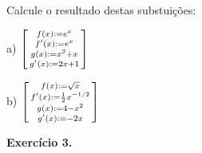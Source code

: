 \documentclass[oneside,12pt]{article}
\begin{document}
\msk

Calcule o resultado destas substuições:

\msk

a) $\ga{Rc} \bsm{
     f (x) := e^x \\
     f'(x) := e^x \\
     g (x) := x^2 + x \\
     g'(x) := 2x + 1 \\
   }$

\msk

b) $\ga{Rc} \bsm{
     f (x) := \sqrt{x} \\
     f'(x) := \frac{1}{2} x^{-1/2} \\
     g (x) := 4 - x^2 \\
     g'(x) := -2x \\
   }$


\newpage

%                                                 

{\bf Exercício 3.}
\end{document}
